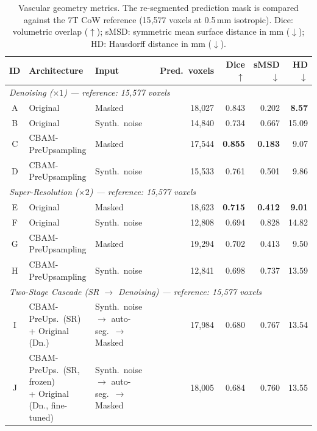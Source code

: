 \documentclass[11pt]{article}
\begin{document}
\begin{table}[!htbp]
  \centering
  \caption{Vascular geometry metrics.  The re-segmented prediction mask is compared against the
  7T CoW reference (15{,}577 voxels at 0.5\,mm isotropic).  Dice: volumetric overlap
  ($\uparrow$); sMSD: symmetric mean surface distance in mm ($\downarrow$); HD: Hausdorff
  distance in mm ($\downarrow$).}
  \label{tab:geometry}
  \setlength{\tabcolsep}{4.5pt}
  \small
  \begin{tabular}{cll l r rrr}
    \toprule
    ID & Architecture & Input & & Pred.\ voxels &
      Dice $\uparrow$ & sMSD $\downarrow$ & HD $\downarrow$ \\
    \midrule
    \multicolumn{8}{l}{\textit{Denoising ($\times 1$) — reference: 15,577 voxels}} \\
    \midrule
    A & Original           & Masked        & & 18{,}027 & 0.843 & 0.202 & \textbf{8.57} \\
    B & Original           & Synth.\ noise & & 14{,}840 & 0.734 & 0.667 & 15.09 \\
    C & CBAM-PreUpsampling & Masked        & & 17{,}544 & \textbf{0.855} & \textbf{0.183} & 9.07 \\
    D & CBAM-PreUpsampling & Synth.\ noise & & 15{,}533 & 0.761 & 0.501 & 9.86 \\
    \midrule
    \multicolumn{8}{l}{\textit{Super-Resolution ($\times 2$) — reference: 15,577 voxels}} \\
    \midrule
    E & Original           & Masked        & & 18{,}623 & \textbf{0.715} & \textbf{0.412} & \textbf{9.01} \\
    F & Original           & Synth.\ noise & & 12{,}808 & 0.694 & 0.828 & 14.82 \\
    G & CBAM-PreUpsampling & Masked        & & 19{,}294 & 0.702 & 0.413 & 9.50 \\
    H & CBAM-PreUpsampling & Synth.\ noise & & 12{,}841 & 0.698 & 0.737 & 13.59 \\
    \midrule
    \multicolumn{8}{l}{\textit{Two-Stage Cascade (SR $\to$ Denoising) — reference: 15,577 voxels}} \\
    \midrule
    I & \makecell[l]{CBAM-PreUps.\ (SR)\\+ Original (Dn.)} & \makecell[l]{Synth.\ noise $\to$\\auto-seg.\ $\to$ Masked} & & 17{,}984 & 0.680 & 0.767 & 13.54 \\
    J & \makecell[l]{CBAM-PreUps.\ (SR, frozen)\\+ Original (Dn., fine-tuned)} & \makecell[l]{Synth.\ noise $\to$\\auto-seg.\ $\to$ Masked} & & 18{,}005 & 0.684 & 0.760 & 13.55 \\
    \bottomrule
  \end{tabular}
\end{table}
\end{document}

